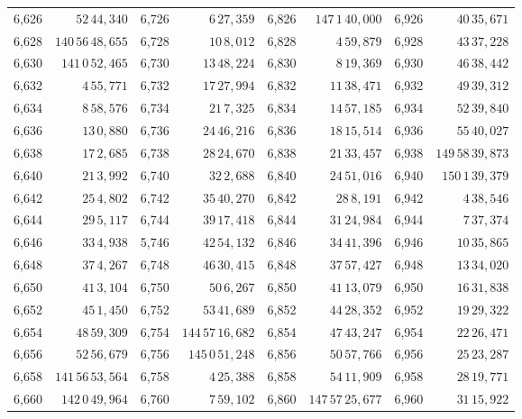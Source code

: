 \begin{tabular}{|r|r||r|r||r|r||r|r|}
6,626 & \(52\,44,\!340\) & 6,726 & \(6\,27,\!359\) & 6,826 & \(147\,1\,40,\!000\) & 6,926 & \(40\,35,\!671\) \\
6,628 & \(140\,56\,48,\!655\) & 6,728 & \(10\,8,\!012\) & 6,828 & \(4\,59,\!879\) & 6,928 & \(43\,37,\!228\) \\
6,630 & \(141\,0\,52,\!465\) & 6,730 & \(13\,48,\!224\) & 6,830 & \(8\,19,\!369\) & 6,930 & \(46\,38,\!442\) \\[1pt]
6,632 & \(4\,55,\!771\) & 6,732 & \(17\,27,\!994\) & 6,832 & \(11\,38,\!471\) & 6,932 & \(49\,39,\!312\) \\
6,634 & \(8\,58,\!576\) & 6,734 & \(21\,7,\!325\) & 6,834 & \(14\,57,\!185\) & 6,934 & \(52\,39,\!840\) \\
6,636 & \(13\,0,\!880\) & 6,736 & \(24\,46,\!216\) & 6,836 & \(18\,15,\!514\) & 6,936 & \(55\,40,\!027\) \\
6,638 & \(17\,2,\!685\) & 6,738 & \(28\,24,\!670\) & 6,838 & \(21\,33,\!457\) & 6,938 & \(149\,58\,39,\!873\) \\
6,640 & \(21\,3,\!992\) & 6,740 & \(32\,2,\!688\) & 6,840 & \(24\,51,\!016\) & 6,940 & \(150\,1\,39,\!379\) \\[1pt]
6,642 & \(25\,4,\!802\) & 6,742 & \(35\,40,\!270\) & 6,842 & \(28\,8,\!191\) & 6,942 & \(4\,38,\!546\) \\
6,644 & \(29\,5,\!117\) & 6,744 & \(39\,17,\!418\) & 6,844 & \(31\,24,\!984\) & 6,944 & \(7\,37,\!374\) \\
6,646 & \(33\,4,\!938\) & 5,746 & \(42\,54,\!132\) & 6,846 & \(34\,41,\!396\) & 6,946 & \(10\,35,\!865\) \\
6,648 & \(37\,4,\!267\) & 6,748 & \(46\,30,\!415\) & 6,848 & \(37\,57,\!427\) & 6,948 & \(13\,34,\!020\) \\
6,650 & \(41\,3,\!104\) & 6,750 & \(50\,6,\!267\) & 6,850 & \(41\,13,\!079\) & 6,950 & \(16\,31,\!838\) \\[1pt]
6,652 & \(45\,1,\!450\) & 6,752 & \(53\,41,\!689\) & 6,852 & \(44\,28,\!352\) & 6,952 & \(19\,29,\!322\) \\
6,654 & \(48\,59,\!309\) & 6,754 & \(144\,57\,16,\!682\) & 6,854 & \(47\,43,\!247\) & 6,954 & \(22\,26,\!471\) \\
6,656 & \(52\,56,\!679\) & 6,756 & \(145\,0\,51,\!248\) & 6,856 & \(50\,57,\!766\) & 6,956 & \(25\,23,\!287\) \\
6,658 & \(141\,56\,53,\!564\) & 6,758 & \(4\,25,\!388\) & 6,858 & \(54\,11,\!909\) & 6,958 & \(28\,19,\!771\) \\
6,660 & \(142\,0\,49,\!964\) & 6,760 & \(7\,59,\!102\) & 6,860 & \(147\,57\,25,\!677\) & 6,960 & \(31\,15,\!922\) \\[1pt]

\end{tabular}
